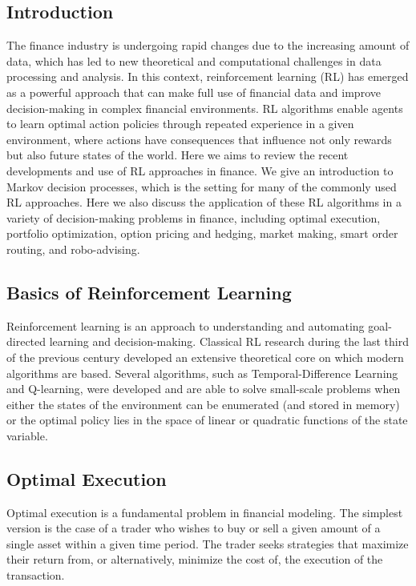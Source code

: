 \documentclass{article}
\begin{document}
\subsection{Introduction}
The finance industry is undergoing rapid changes due to the increasing amount of data, which has led to new theoretical and computational challenges in data processing and analysis. In this context, reinforcement learning (RL) has emerged as a powerful approach that can make full use of financial data and improve decision-making in complex financial environments. RL algorithms enable agents to learn optimal action policies through repeated experience in a given environment, where actions have consequences that influence not only rewards but also future states of the world. Here we aims to review the recent developments and use of RL approaches in finance. We give an introduction to Markov decision processes, which is the setting for many of the commonly used RL approaches. Here we also discuss the application of these RL algorithms in a variety of decision-making problems in finance, including optimal execution, portfolio optimization, option pricing and hedging, market making, smart order routing, and robo-advising.

\subsection{Basics of Reinforcement Learning}
Reinforcement learning is an approach to understanding and automating goal-directed learning and decision-making. Classical RL research during the last third of the previous century developed an extensive theoretical core on which modern algorithms are based. Several algorithms, such as Temporal-Difference Learning and Q-learning, were developed and are able to solve small-scale problems when either the states of the environment can be enumerated (and stored in memory) or the optimal policy lies in the space of linear or quadratic functions of the state variable.


\subsection{Optimal Execution}
Optimal execution is a fundamental problem in financial modeling. The simplest version is the case
of a trader who wishes to buy or sell a given amount of a single asset within a given time period.
The trader seeks strategies that maximize their return from, or alternatively, minimize the cost of, the
execution of the transaction.
\end{document}
